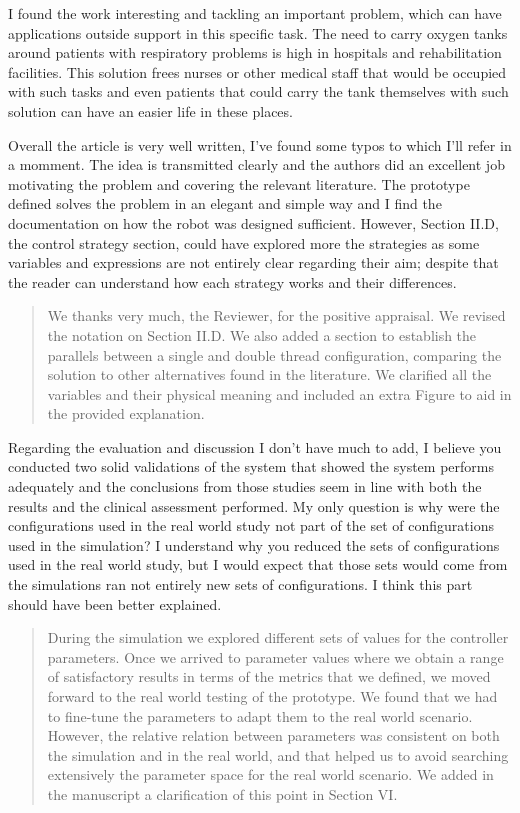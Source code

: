 \documentclass[journal,onecolumn,12pt]{IEEEtran}
\begin{document}
I found the work interesting and tackling an important problem, which can have applications outside support in this specific task. The need to carry oxygen tanks around patients with respiratory problems is high in hospitals and rehabilitation facilities. This solution frees nurses or other medical staff that would be occupied with such tasks and even patients that could carry the tank themselves with such solution can have an easier life in these places.

Overall the article is very well written, I've found some typos to which I'll refer in a momment. The idea is transmitted clearly and the authors did an excellent job motivating the problem and covering the relevant literature. The prototype defined solves the problem in an elegant and simple way and I find the documentation on how the robot was designed sufficient. However, Section II.D, the control strategy section, could have explored more the strategies as some variables and expressions are not entirely clear regarding their aim; despite that the reader can understand how each strategy works and their differences.

\begin{quotation}
{\color{blue}
We thanks very much, the Reviewer, for the positive appraisal.  We revised the notation on Section II.D.  We also added a section to establish the parallels between a single and double thread configuration, comparing the solution to other alternatives found in the literature.  We clarified all the variables and their physical meaning and included an extra Figure to aid in the provided explanation.
}
\end{quotation}


Regarding the evaluation and discussion I don't have much to add, I believe you conducted two solid validations of the system that showed the system performs adequately and the conclusions from those studies seem in line with both the results and the clinical assessment performed. My only question is why were the configurations used in the real world study not part of the set of configurations used in the simulation? I understand why you reduced the sets of configurations used in the real world study, but I would expect that those sets would come from the simulations ran not entirely new sets of configurations. I think this part should have been better explained.

\begin{quotation}
{\color{blue}
During the simulation we explored different sets of values for the controller parameters.  Once we arrived to parameter values where we obtain a range of satisfactory results in terms of the metrics that we defined, we moved forward to the real world testing of the prototype.  We found that we had to fine-tune the parameters to adapt them to the real world scenario.  However, the relative relation between parameters was consistent on both the simulation and in the real world, and that helped us to avoid searching extensively the parameter space for the real world scenario.  We added in the manuscript a clarification of this point in Section VI.
}
\end{quotation}
\end{document}
